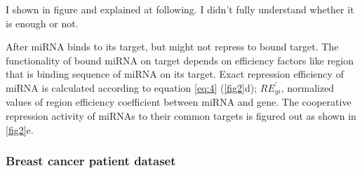 \documentclass[]{article}
\begin{document}

I shown in figure and explained at following. I didn't fully understand
whether it is enough or not.

After miRNA binds to its target, but might not repress to bound target.
The functionality of bound miRNA on target depends on efficiency factors
like region that is binding sequence of miRNA on its target. Exact
repression efficiency of miRNA is calculated according to equation
\eqref{eq:4} (\autoref{fig2}d); \(RE^\prime_{gi}\), normalized values of
region efficiency coefficient between miRNA and gene. The cooperative
repression activity of miRNAs to their common targets is figured out as
shown in \autoref{fig2}e.

\hypertarget{breast-cancer-patient-dataset}{%
\subsubsection{Breast cancer patient
dataset}\label{breast-cancer-patient-dataset}}
\end{document}
